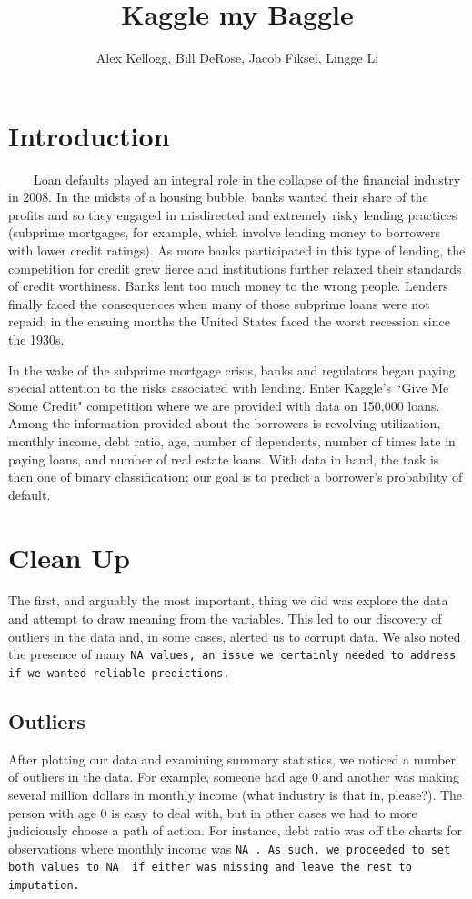 \documentclass[11pt, oneside]{article}   	%
\title{Kaggle my Baggle}
\author{Alex Kellogg, Bill DeRose, Jacob Fiksel, Lingge Li}
\begin{document}
\maketitle
\section{Introduction}
	 ~~~~Loan defaults played an integral role in the collapse of the financial industry in 2008. 
	In the midsts of a housing bubble, banks wanted their share of the profits and so they engaged in
	 misdirected and extremely risky lending practices (subprime mortgages, for example, which involve lending money to borrowers with lower credit ratings). 
	 As more banks participated in this type of lending, the competition for credit grew fierce and
	 institutions further relaxed their standards of credit worthiness. Banks  lent too 
	 much money to the wrong people. Lenders finally faced the consequences when many of 
	 those subprime loans were not repaid;  in the ensuing months the United States faced the 
	 worst recession since the 1930s. 
	 
	 In the wake of the subprime mortgage crisis, banks and regulators began paying special 
	 attention to the risks associated with lending. Enter Kaggle's ``Give Me Some Credit" competition where
	 we are provided with data on 150,000 loans. Among the information provided about the 
	 borrowers is revolving utilization, monthly income, debt ratio, age, number
	 of dependents, number of times late in paying loans, and number of real estate loans. 
	 With data in hand, the task is then one of binary classification; our goal is to predict a 
	 borrower's probability of default. 



\section{Clean Up}
	The first, and arguably the most important, thing we did was explore the data and attempt
	to draw meaning from the variables. This led to our discovery of outliers in the data and, in some
	cases, alerted us to corrupt data. We also noted the presence of many \tt NA\rm ~values, an issue we certainly needed to address if we wanted reliable predictions.
	
	
	\subsection{Outliers}
		After plotting our data and examining summary statistics, we noticed a number of outliers in the data. For example, someone had age 0 and another was making several million dollars in monthly income (what industry is that in, please?). The person with age 0 is easy to deal with, but 
		in other cases we had to more judiciously choose a path of action. For instance,
		debt ratio was off the charts for observations
		where monthly income was \tt NA\rm~. As such, we proceeded to set both values to \tt NA\rm~
		if either was missing and leave the rest to imputation.
\end{document}
